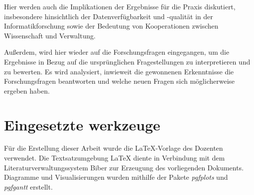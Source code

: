 Hier werden auch die Implikationen der Ergebnisse für die Praxis diskutiert, insbesondere hinsichtlich der Datenverfügbarkeit und -qualität in der Informatikforschung sowie der Bedeutung von Kooperationen zwischen Wissenschaft und Verwaltung.

Außerdem, wird hier wieder auf die Forschungsfragen eingegangen, um die Ergebnisse in Bezug auf die ursprünglichen Fragestellungen zu interpretieren und zu bewerten. Es wird analysiert, inwieweit die gewonnenen Erkenntnisse die Forschungsfragen beantworten und welche neuen Fragen sich möglicherweise ergeben haben.

\section{Eingesetzte werkzeuge}

Für die Erstellung dieser Arbeit wurde die \LaTeX-Vorlage des Dozenten verwendet. Die Textsatzumgebung \LaTeX{} diente in Verbindung mit dem Literaturverwaltungssystem Biber zur Erzeugung des vorliegenden Dokuments. Diagramme und Visualisierungen wurden mithilfe der Pakete \textit{pgfplots} und \textit{pgfgantt} erstellt.
